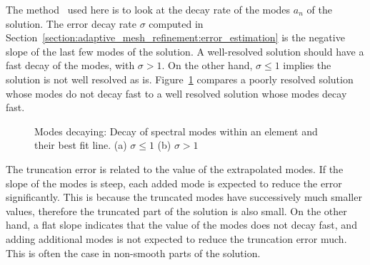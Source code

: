 The method~\cite{Mavriplis1990} used here is to look at the decay rate of the modes \(a_n\) of the
solution. The error decay rate \(\sigma \) computed in
Section~\ref{section:adaptive_mesh_refinement:error_estimation} is the negative slope of the last
few modes of the solution. A well-resolved solution should have a fast decay of the modes, with
\(\sigma > 1\). On the other hand, \(\sigma \leqslant 1\) implies the solution is not well resolved
as is. Figure~\ref{fig:decaying_modes} compares a poorly resolved solution whose modes do not decay
fast to a well resolved solution whose modes decay fast.

\begin{figure}[H]
    \centering
    \hfill
    \caption{Modes decaying: Decay of spectral modes within an element and their best fit line. (a) \(\sigma \leqslant 1\) (b) \(\sigma > 1\)}\label{fig:decaying_modes}
\end{figure}

The truncation error is related to the value of the extrapolated modes. If the slope of the modes is
steep, each added mode is expected to reduce the error significantly. This is because the truncated
modes have successively much smaller values, therefore the truncated part of the solution is also
small. On the other hand, a flat slope indicates that the value of the modes does not decay fast,
and adding additional modes is not expected to reduce the truncation error much. This is often the
case in non-smooth parts of the solution.

